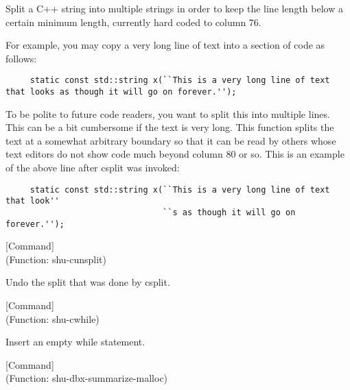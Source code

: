 \begin{doc-string}
Split a C++ string into multiple strings in order to keep the line length
below a certain minimum length, currently hard coded to column 76.

For example, you may copy a very long line of text into a section of code as
follows:

\small{\begin{verbatim}
     static const std::string x(``This is a very long line of text that looks as though it will go on forever.'');
\end{verbatim}}

To be polite to future code readers, you want to split this into multiple lines.
This can be a bit cumbersome if the text is very long.  This function splits the
text at a somewhat arbitrary boundary so that it can be read by others whose
text editors do not show code much beyond column 80 or so.  This is an example
of the above line after csplit was invoked:

\small{\begin{verbatim}
     static const std::string x(``This is a very long line of text that look''
                                ``s as though it will go on forever.'');
\end{verbatim}}
\end{doc-string}

\vspace{1em}
\noindent
{}
\usebox{\funcname}
 \hfill [Command]\\%
 (Function: shu-cunsplit)

\begin{doc-string}
Undo the split that was done by csplit.
\end{doc-string}

\vspace{1em}
\noindent
{}
\usebox{\funcname}
 \hfill [Command]\\%
 (Function: shu-cwhile)

\begin{doc-string}
Insert an empty while statement.
\end{doc-string}

\vspace{1em}
\noindent
{}
\usebox{\funcname}
 \hfill [Command]\\%
 (Function: shu-dbx-summarize-malloc)

